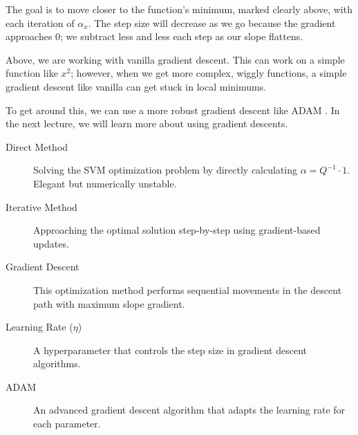 The goal is to move closer to the function's minimum, marked clearly above, with each iteration of $\alpha_x$. The step size will decrease as we go because the gradient approaches $0$; we subtract less and less each step as our slope flattens. 

Above, we are working with vanilla gradient descent. This can work on a simple function like $x^2$; however, when we get more complex, wiggly functions, a simple gradient descent like vanilla can get stuck in local minimums.

To get around this, we can use a more robust gradient descent like ADAM \cite{kingma2014adam}. In the next lecture, we will learn more about using gradient descents. 

\begin{tcolorbox}[title=Key Terms \& Definitions, colback=gray!10, colframe=black, width=\textwidth]
\begin{description}
\item[Direct Method] Solving the SVM optimization problem by directly calculating $\alpha = Q^{-1} \cdot 1$. Elegant but numerically unstable.
\item[Iterative Method] Approaching the optimal solution step-by-step using gradient-based updates.
\item[Gradient Descent] This optimization method performs sequential movements in the descent path with maximum slope gradient.
\item[Learning Rate ($\eta$)] A hyperparameter that controls the step size in gradient descent algorithms.
\item[ADAM] An advanced gradient descent algorithm that adapts the learning rate for each parameter.
\end{description}
\end{tcolorbox}



